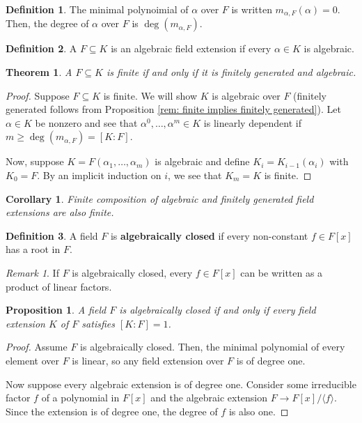 \documentclass[
    parskip=half,
    toc=flat,
    toc=sectionentrydotfill,
]{scrartcl}  %
\theoremstyle{definition}
\newtheorem{definition}{Definition}[section]
\theoremstyle{plain}
\newtheorem{theorem}{Theorem}[section]
\newtheorem{corollary}{Corollary}[theorem]
\newtheorem{proposition}{Proposition}[section]
\theoremstyle{remark}
\newtheorem{remark}{Remark}[section]
\begin{document}
\begin{definition}
    The minimal polynoimial of $\alpha$ over $F$ is written $m_{\alpha,F}(\alpha)=0$.
    Then, the degree of $\alpha$ over $F$ is $\deg(m_{\alpha,F})$.
\end{definition}

\begin{definition}
    A $F\subseteq K$ is an algebraic field extension if every $\alpha\in K$ is algebraic.
\end{definition}

\begin{theorem}
    A $F\subseteq K$ is finite if and only if it is finitely generated and algebraic.
\end{theorem}

\begin{proof}
    Suppose $F\subseteq K$ is finite.
    We will show $K$ is algebraic over $F$ (finitely generated follows from
    Proposition \ref{rem: finite implies finitely generated}).
    Let $\alpha\in K$ be nonzero and see that $\alpha^0,\dots,\alpha^m\in K$ is
    linearly dependent if $m\geq\deg(m_{\alpha,F})=[K:F]$.

    Now, suppose $K=F(\alpha_1,\dots,\alpha_m)$ is algebraic and define
    $K_i=K_{i-1}(\alpha_i)$ with $K_0=F$.
    By an implicit induction on $i$, we see that $K_m=K$ is finite.
\end{proof}

\begin{corollary}
    Finite composition of algebraic and finitely generated field extensions
    are also finite.
\end{corollary}

\begin{definition}
    A field $F$ is \textbf{algebraically closed} if every non-constant
    $f\in F[x]$ has a root in $F$.
\end{definition}

\begin{remark}
    If $F$ is algebraically closed, every $f\in F[x]$ can be written as a
    product of linear factors.
\end{remark}

\begin{proposition}
    A field $F$ is algebraically closed if and only if every field extension
    $K$ of $F$ satisfies $[K:F]=1$.
\end{proposition}

\begin{proof}
    Assume $F$ is algebraically closed.
    Then, the minimal polynomial of every element over $F$ is linear, so any
    field extension over $F$ is of degree one.

    Now suppose every algebraic extension is of degree one.
    Consider some irreducible factor $f$ of a polynomial in $F[x]$ and the
    algebraic extension $F\to F[x]/\langle f\rangle$.
    Since the extension is of degree one, the degree of $f$ is also one.
\end{proof}
\end{document}
